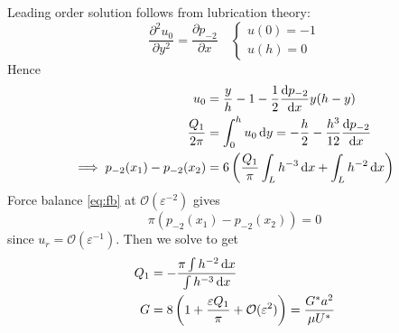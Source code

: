 \documentclass{jknotes}
\begin{document}
Leading order solution follows from lubrication theory:
\begin{equation}
	\frac{\partial^2 u_0}{\partial y^2} = \frac{\partial p_{-2}}{\partial x}
	\hspace{1em} \begin{cases} u(0) = -1 \\ u(h) = 0 \end{cases}
\end{equation}
Hence
\begin{align}
	u_0 &= \frac{y}{h} - 1 - \frac{1}{2} \frac{\diffd p_{-2}}{\diffd x} y(h-y)
	\\
	\frac{Q_1}{2\pi} &= \int_0^h u_0 \, \diffd y = - \frac{h}{2} -
	\frac{h^3}{12} \frac{\diffd p_{-2}}{\diffd x} \\
	\implies p_{-2}(x_1) - p_{-2}(x_2) &= 6\left( \frac{Q_1}{\pi} \int_L h^{-3}
	\, \diffd x + \int_L h^{-2} \,\diffd x\right)
\end{align}
Force balance \eqref{eq:fb} at $\mathcal{O}(\varepsilon^{-2})$ gives
\begin{equation}
	\pi(p_{-2}(x_1) - p_{-2}(x_2)) = 0
\end{equation}
since $u_r = \mathcal{O}(\varepsilon^{-1})$. Then we solve to get
\begin{align}
	Q_1 &= -\frac{\pi \int h^{-2} \, \diffd x}{\int h^{-3} \, \diffd x} \\
	G &= 8 \left( 1 + \frac{\varepsilon Q_1}{\pi} +
	\mathcal{O}(\varepsilon^2)\right)  = \frac{G^* a^2}{\mu U^*}
\end{align}
\end{document}
